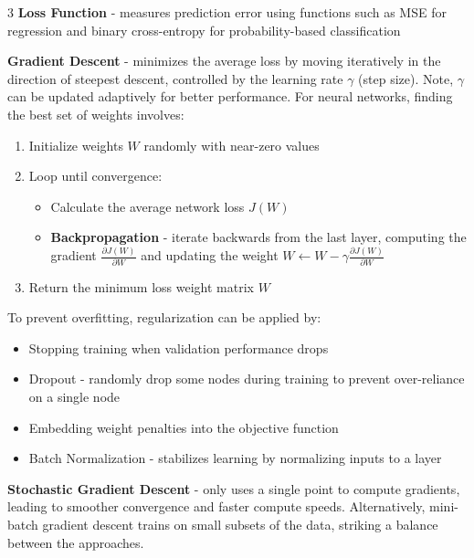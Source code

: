 \documentclass[10pt,landscape]{article}
\begin{document}
\begin{multicols}{3}
    \smallskip
    \textbf{Loss Function} - measures prediction error using functions such as MSE for regression and binary cross-entropy for probability-based classification

    \smallskip
    \textbf{Gradient Descent} - minimizes the average loss by moving iteratively in the direction of steepest descent, controlled by the learning rate $\gamma$ (step size). Note, $\gamma$ can be updated adaptively for better performance. For neural networks, finding the best set of weights involves:
    \begin{enumerate}[leftmargin=5mm]
        \itemsep -.4mm
        \item Initialize weights $W$ randomly with near-zero values
        \item Loop until convergence:
              \begin{itemize}[label={--},leftmargin=4mm]
                  \itemsep -.4mm
                  \item Calculate the average network loss $J(W)$
                  \item \textbf{Backpropagation} - iterate backwards from the last layer, computing the gradient $\frac{\partial J(W)}{\partial W}$ and updating the weight $W \leftarrow W - \gamma \frac{\partial J(W)}{\partial W}$
              \end{itemize}
        \item Return the minimum loss weight matrix $W$
    \end{enumerate}

    To prevent overfitting, regularization can be applied by:
    \begin{itemize}[label={--},leftmargin=4mm]
        \itemsep -.4mm
        \item Stopping training when validation performance drops
        \item Dropout - randomly drop some nodes during training to prevent over-reliance on a single node
        \item Embedding weight penalties into the objective function
        \item Batch Normalization - stabilizes learning by normalizing inputs to a layer
    \end{itemize}
    \textbf{Stochastic Gradient Descent} - only uses a single point to compute gradients, leading to smoother convergence and faster compute speeds. Alternatively, mini-batch gradient descent trains on small subsets of the data, striking a balance between the approaches.
    \\


\end{multicols}
\end{document}
